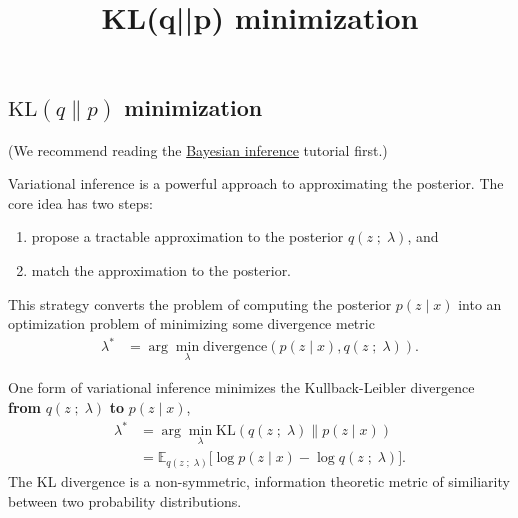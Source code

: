 \title{KL(q||p) minimization}

\subsection{$\text{KL}(q\|p)$ minimization}

(We recommend reading the 
\href{tut_bayesian_inference.html}{Bayesian inference} tutorial first.)

Variational inference is a powerful approach to approximating the posterior. The
core idea has two steps:
\begin{enumerate}
   \item propose a tractable approximation to the posterior $q(z\;;\;\lambda)$,
   and
   \item match the approximation to the posterior.
 \end{enumerate} 
This strategy converts the problem of computing the posterior $p(z \mid x)$ into
an optimization problem of minimizing some divergence metric
\begin{align*}
  \lambda^* 
  &=
  \arg\min_\lambda \text{divergence}( 
  p(z \mid x)
  ,
  q(z\;;\;\lambda)
  ).
\end{align*}

One form of variational inference minimizes the Kullback-Leibler divergence 
\textbf{from} $q(z\;;\;\lambda)$ \textbf{to} $p(z \mid x)$,
\begin{align*}
  \lambda^* 
  &=
  \arg\min_\lambda \text{KL}( 
  q(z\;;\;\lambda)
  \|
  p(z \mid x)
  )\\
  &=
  \mathbb{E}_{q(z\;;\;\lambda)}
  \big[
  \log p(z \mid x)
  -
  \log q(z\;;\;\lambda)
  \big].
\end{align*}
The KL divergence is a non-symmetric, information theoretic metric of
similiarity between two probability distributions.
